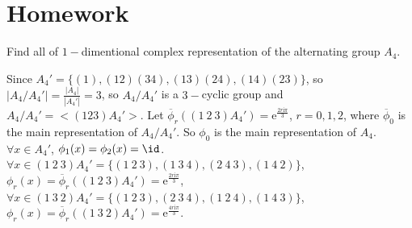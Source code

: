 \documentclass{ctexart}
\newif\ifpreface
\begin{document}
\large
\setlength{\baselineskip}{1.2em}
\ifpreface

\else
\maketitle
\fi
{}
\iffalse
\section{Homework}
\begin{problem}
Find all of $1-$dimentional complex representation of the alternating group $A_4$.
\end{problem}
\begin{solution}
    Since $A_4'=\{(1),(12)(34),(13)(24),(14)(23)\}$, so $|A_4/A_4'|=\frac{|A_4|}{|A_4'|}=3$, so $A_4/A_4'$ is a $3-$cyclic group and $A_4/A_4'=<(123)A_4'>$. Let $\overline{\phi}_r((1\ 2\ 3)A_4')=\mathrm{e}^{\frac{2r\mathrm{i}   \pi}{3}}$, $r=0,1,2$, where $\overline{\phi}_0$ is the main representation of $A_4/A_4'$. So $\phi_0$ is the main representation of $A_4$. $\forall x\in A_4'$, $\phi_1(x)=\phi_2(x)=\id$. $\forall x\in (1\ 2\ 3)A_4'=\{(1\ 2\ 3),(1 \ 3\ 4), (2\ 4\ 3), (1\ 4\ 2)\}$, $\phi_r(x)=\overline{\phi}_r((1\ 2\ 3)A_4')=\mathrm{e}^{\frac{2r\mathrm{i}\pi}{3}}$, $\forall x\in (1\ 3\ 2)A_4'=\{(1\ 2\ 3), (2\ 3\ 4), (1\ 2\ 4), (1\ 4\ 3)\}$, $\phi_r(x)=\overline{\phi}_r((1\ 3\ 2)A_4')=\mathrm{e}^{\frac{4r\mathrm{i}   \pi}{3}}$.
\end{solution}
\end{document}

